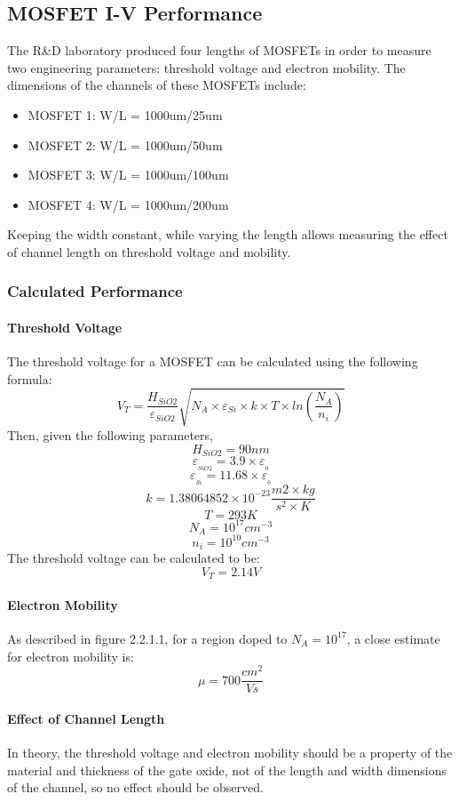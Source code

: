 \documentclass[12pt]{article}
\begin{document}
\subsection{MOSFET I-V Performance}
The R\&D laboratory produced four lengths of MOSFETs in order to measure two engineering parameters: threshold voltage and electron mobility. The dimensions of the channels of these MOSFETs include:
\begin{itemize}
    \item MOSFET 1: W/L = 1000um/25um
    \item MOSFET 2: W/L = 1000um/50um
    \item MOSFET 3: W/L = 1000um/100um
    \item MOSFET 4: W/L = 1000um/200um
\end{itemize}
Keeping the width constant, while varying the length allows measuring the effect of channel length on threshold voltage and mobility.

\subsubsection{Calculated Performance}
\paragraph{Threshold Voltage}
The threshold voltage for a MOSFET can be calculated using the following formula:
\[V_T = \frac{H_{SiO2}}{\varepsilon_{SiO2}}\sqrt{N_A \times \varepsilon_{Si} \times k \times T \times ln(\frac{N_A}{n_i})} \]
Then, given the following parameters,
\[H_{SiO2} = 90nm \]
\[\varepsilon_{_{SiO2}} = 3.9 \times \varepsilon_{_0} \]
\[\varepsilon_{_{Si}} = 11.68 \times \varepsilon_{_0} \]
\[k = 1.38064852 × 10^{-23} \frac{m2 \times kg}{s^2 \times K} \]
\[T = 293K \]
\[N_A = 10^{17} cm^{-3} \]
\[n_i = 10^{10} cm^{-3} \]
The threshold voltage can be calculated to be:
\[ V_T = 2.14V \]

\paragraph{Electron Mobility}
As described in figure 2.2.1.1, for a region doped to $N_A = 10^{17}$, a close estimate for electron mobility is:
\[\mu = 700\frac{cm^2}{Vs} \]

\paragraph{Effect of Channel Length}
In theory, the threshold voltage and electron mobility should be a property of the material and thickness of the gate oxide, not of the length and width dimensions of the channel, so no effect should be observed.
\end{document}
